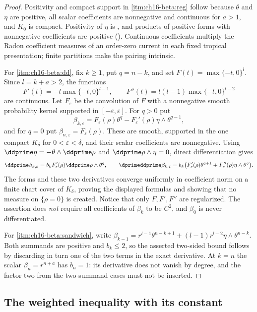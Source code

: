 \begin{proof}
Positivity and compact support in \cref{itm:ch16-beta:reg} follow because
$\theta$ and $\eta$ are positive, all scalar coefficients are nonnegative
and continuous for $a>1$, and $K_0$ is compact.  Positivity of $\eta$ is
, and products of positive forms with
nonnegative coefficients are positive
().  Continuous coefficients multiply
the Radon coefficient measures of an order-zero current in each fixed
tropical presentation; finite partitions make the pairing intrinsic.

For \cref{itm:ch16-beta:dd}, fix $k\geq1$, put $q=n-k$, and set
$F(t)=\max\{-t,0\}^{l}$.  Since $l=k+a>2$, the functions
\[
 F'(t)=-l\max\{-t,0\}^{l-1},\qquad
 F''(t)=l(l-1)\max\{-t,0\}^{l-2}
\]
are continuous.  Let $F_\varepsilon$ be the convolution of $F$ with a
nonnegative smooth probability kernel supported in $[-\varepsilon,
\varepsilon]$.  For $q>0$ put
\[
 \beta_{k,\varepsilon}=F_\varepsilon(\rho)\theta^q
       -F_\varepsilon'(\rho)\eta\wedge\theta^{q-1},
\]
and for $q=0$ put $\beta_{n,\varepsilon}=F_\varepsilon(\rho)$.  These are
smooth, supported in the one compact $K_\delta$ for
$0<\varepsilon<\delta$, and their scalar coefficients are nonnegative.
Using
$\ddprime\eta=-\theta\wedge\ddprime\rho$ and
$\ddprime\rho\wedge\eta=0$, direct differentiation gives
\[
 \ddprime\beta_{k,\varepsilon}
     =b_kF_\varepsilon'(\rho)\ddprime\rho\wedge\theta^q,
 \qquad
 \dprimeddprime\beta_{k,\varepsilon}
     =b_k\bigl(F_\varepsilon'(\rho)\theta^{q+1}
              +F_\varepsilon''(\rho)\eta\wedge\theta^q\bigr).
\]
The forms and these two derivatives converge uniformly in coefficient norm
on a finite chart cover of $K_\delta$, proving the displayed formulas and
showing that no measure on $\{\rho=0\}$ is created.  Notice that only
$F,F',F''$ are regularized.  The assertion does \emph{not} require all
coefficients of $\beta_k$ to be $C^2$, and $\beta_0$ is never differentiated.

For \cref{itm:ch16-beta:sandwich}, write
$\beta_{k-1}=r^{l-1}\theta^{n-k+1}
 +(l-1)r^{l-2}\eta\wedge\theta^{n-k}$.
Both summands are positive and $b_k\leq2$, so the asserted two-sided bound
follows by discarding in turn one of the two terms in the exact derivative.
At $k=n$ the scalar $\beta_n=r^{n+a}$ has $b_n=1$: its derivative does not
vanish by degree, and the factor two from the two-summand cases must not be
inserted.
\end{proof}

\subsection{The weighted inequality with its constant}
\label{sec:ch16-cln-weighted}

